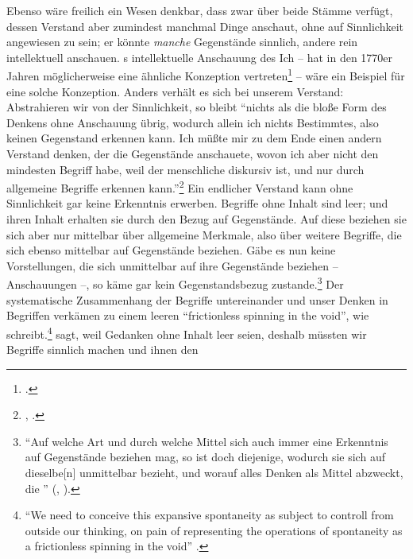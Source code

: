 Ebenso wäre freilich ein Wesen denkbar, dass zwar über beide Stämme verfügt,
dessen Verstand aber zumindest manchmal Dinge anschaut, ohne auf Sinnlichkeit
angewiesen zu sein; er könnte \emph{manche} Gegenstände sinnlich, andere rein
intellektuell anschauen. s
intellektuelle Anschauung des Ich --  hat in den 1770er
Jahren möglicherweise eine ähnliche Konzeption
vertreten\footnote{\cite[Vgl.][78]{Duesing:SpontanediskursiveSynthesis2004}.} --
wäre ein Beispiel für eine solche Konzeption.
Anders verhält es sich bei unserem Verstand: Abstrahieren wir von der
Sinnlichkeit, so bleibt \enquote{nichts als die bloße Form des Denkens ohne
Anschauung übrig, wodurch allein ich nichts Bestimmtes, also keinen Gegenstand
erkennen kann. Ich müßte mir zu dem Ende einen andern Verstand denken, der die
Gegenstände anschauete, wovon ich aber nicht den mindesten Begriff habe, weil
der menschliche diskursiv ist, und nur durch allgemeine Begriffe erkennen
kann.}\footnote{\cite[][\S~57]{Kant:ProlegomenazueinerjedenkuenftigenMetaphysikdiealsWissenschaftwirdauftretenkoennen1977},
\cite[][IV: 355.33--356.1]{Kant:GesammelteWerke1900ff.}.}
Ein endlicher Verstand kann ohne Sinnlichkeit gar keine Erkenntnis
erwerben. Begriffe ohne Inhalt sind leer; und ihren Inhalt erhalten sie
durch den Bezug auf Gegenstände. Auf diese beziehen sie sich aber nur mittelbar
über allgemeine Merkmale, also über weitere Begriffe, die sich ebenso mittelbar auf
Gegenstände beziehen. Gäbe es nun keine Vorstellungen, die sich unmittelbar auf
ihre Gegenstände beziehen -- Anschauungen --, so käme gar kein Gegenstandsbezug
zustande.\footnote{\enquote{Auf welche Art und durch welche Mittel sich auch
immer eine Erkenntnis auf Gegenstände beziehen mag, so ist doch diejenige,
wodurch sie sich auf dieselbe[n] unmittelbar bezieht, und worauf alles Denken
als Mittel abzweckt, die }
\mkbibparens{\cite[][B 33]{Kant:KritikderreinenVernunft2003},
\cite[][III: 49.6--9]{Kant:GesammelteWerke1900ff.}}.} Der systematische
Zusammenhang der Begriffe untereinander und unser Denken in Begriffen verkämen
zu einem leeren \enquote{frictionless spinning in the void}, wie
 schreibt.\footnote{\enquote{We need
to conceive this expansive spontaneity as subject to controll from outside our
thinking, on pain of representing the operations of spontaneity as a
frictionless spinning in the void} \parencite[][11]{McDowell:MindandWorld1994}.}
 sagt, weil Gedanken ohne Inhalt
leer seien, deshalb müssten wir Begriffe sinnlich machen und ihnen den
